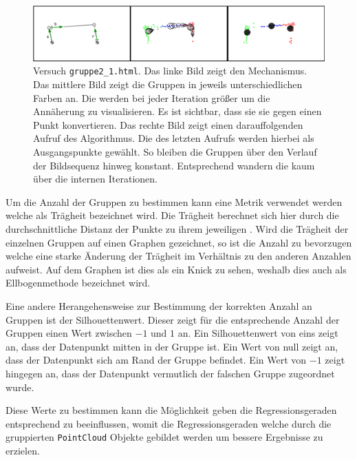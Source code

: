 \begin{figure}
    \centering
    \includegraphics[width=\textwidth]{gfx/k_means_centroids_edit.png}
    \caption[Versuch \lstinline{gruppe2_1.html}]{Versuch \lstinline{gruppe2_1.html}. Das linke Bild zeigt den Mechanismus. Das mittlere Bild zeigt die Gruppen in jeweils unterschiedlichen Farben an. Die  werden bei jeder Iteration grö{\ss}er um die Annäherung zu visualisieren. Es ist sichtbar, dass sie sie gegen einen Punkt konvertieren. Das rechte Bild zeigt einen darauffolgenden Aufruf des Algorithmus. Die  des letzten Aufrufs werden hierbei als Ausgangspunkte gewählt. So bleiben die Gruppen über den Verlauf der Bildsequenz hinweg konstant. Entsprechend wandern die  kaum über die internen Iterationen.}
    \label{fig:gruppe2_1}
\end{figure}

Um die Anzahl der Gruppen zu bestimmen kann eine Metrik verwendet werden welche als Trägheit bezeichnet wird.
Die Trägheit berechnet sich hier durch die durchschnittliche Distanz der Punkte zu ihrem jeweiligen .
Wird die Trägheit der einzelnen Gruppen auf einen Graphen gezeichnet, so ist die Anzahl zu bevorzugen welche eine starke Änderung der Trägheit im Verhältnis zu den anderen Anzahlen aufweist.
Auf dem Graphen ist dies als ein Knick zu sehen, weshalb dies auch als Ellbogenmethode bezeichnet wird.

Eine andere Herangehensweise zur Bestimmung der korrekten Anzahl an Gruppen ist der Silhouettenwert.
Dieser zeigt für die entsprechende Anzahl der Gruppen einen Wert zwischen $-1$ und $1$ an.
Ein Silhouettenwert von eins zeigt an, dass der Datenpunkt mitten in der Gruppe ist.
Ein Wert von null zeigt an, dass der Datenpunkt sich am Rand der Gruppe befindet.
Ein Wert von $-1$ zeigt hingegen an, dass der Datenpunkt vermutlich der falschen Gruppe zugeordnet wurde.


Diese Werte zu bestimmen kann die Möglichkeit geben die Regressionsgeraden entsprechend zu beeinflussen, womit die Regressionsgeraden welche durch die gruppierten \lstinline{PointCloud} Objekte gebildet werden um bessere Ergebnisse zu erzielen.

